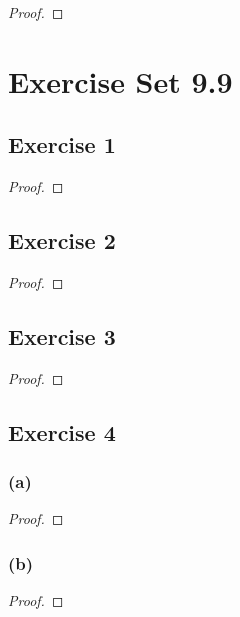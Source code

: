 \documentclass[14pt]{extarticle}
\begin{document}
\begin{proof}

\end{proof}

\section{Exercise Set 9.9}

\subsection{Exercise 1}

\begin{proof}

\end{proof}

\subsection{Exercise 2}

\begin{proof}

\end{proof}

\subsection{Exercise 3}

\begin{proof}

\end{proof}

\subsection{Exercise 4}

\subsubsection{(a)}

\begin{proof}

\end{proof}

\subsubsection{(b)}

\begin{proof}

\end{proof}
\end{document}
